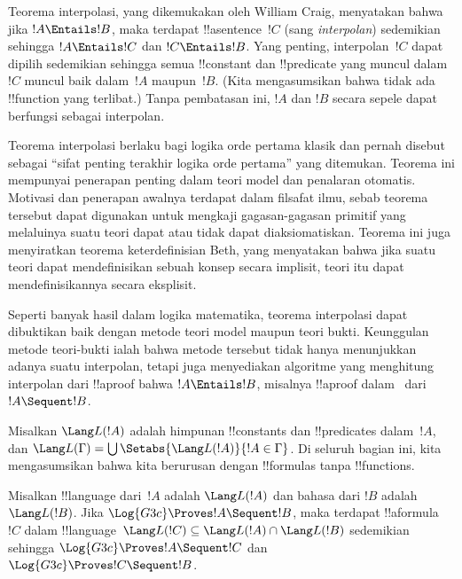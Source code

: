 \documentclass[../../../include/open-logic-section]{subfiles}
\begin{document}


Teorema interpolasi, yang dikemukakan oleh William Craig, menyatakan bahwa
jika $!A \Entails !B$, maka terdapat !!a{sentence}~$!C$ (sang
\emph{interpolan}) sedemikian sehingga $!A \Entails !C$ dan $!C \Entails
!B$. Yang penting, interpolan~$!C$ dapat dipilih sedemikian sehingga semua
!!{constant} dan !!{predicate} yang muncul dalam~$!C$ muncul baik dalam~$!A$
maupun~$!B$. (Kita mengasumsikan bahwa tidak ada !!{function} yang terlibat.)
Tanpa pembatasan ini, $!A$ dan $!B$ secara sepele dapat berfungsi sebagai
interpolan.

Teorema interpolasi berlaku bagi logika orde pertama klasik dan pernah
disebut sebagai ``sifat penting terakhir logika orde pertama'' yang
ditemukan. Teorema ini mempunyai penerapan penting dalam teori model dan
penalaran otomatis. Motivasi dan penerapan awalnya terdapat dalam filsafat
ilmu, sebab teorema tersebut dapat digunakan untuk mengkaji gagasan-gagasan
primitif yang melaluinya suatu teori dapat atau tidak dapat diaksiomatiskan.
Teorema ini juga menyiratkan teorema keterdefinisian Beth, yang menyatakan
bahwa jika suatu teori dapat mendefinisikan sebuah konsep secara implisit,
teori itu dapat mendefinisikannya secara eksplisit.

Seperti banyak hasil dalam logika matematika, teorema interpolasi dapat
dibuktikan baik dengan metode teori model maupun teori bukti. Keunggulan
metode teori-bukti ialah bahwa metode tersebut tidak hanya menunjukkan
adanya suatu interpolan, tetapi juga menyediakan algoritme yang menghitung
interpolan dari !!a{proof} bahwa $!A \Entails !B$, misalnya !!a{proof}
dalam~ dari $!A \Sequent !B$.

Misalkan $\Lang L(!A)$ adalah himpunan !!{constant}s dan !!{predicate}s
dalam~$!A$, dan $\Lang L(\Gamma) = \bigcup \Setabs{\Lang L(!A)}{!A \in
\Gamma}$. Di seluruh bagian ini, kita mengasumsikan bahwa kita berurusan
dengan !!{formula}s tanpa !!{function}s.

\begin{thm}
Misalkan !!{language} dari~$!A$ adalah $\Lang L(!A)$ dan bahasa dari $!B$
adalah $\Lang L(!B)$. Jika $\Log{G3c} \Proves !A \Sequent !B$, maka
terdapat !!a{formula}~$!C$ dalam !!{language}~$\Lang L(!C) \subseteq
\Lang L(!A) \cap \Lang L(!B)$ sedemikian sehingga $\Log{G3c} \Proves
!A \Sequent !C$ dan $\Log{G3c} \Proves !C \Sequent !B$.
\end{thm}
\end{document}
